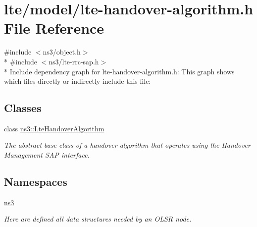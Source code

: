 \hypertarget{lte-handover-algorithm_8h}{}\section{lte/model/lte-\/handover-\/algorithm.h File Reference}
\label{lte-handover-algorithm_8h}
{\ttfamily \#include $<$ns3/object.\+h$>$}\\*
{\ttfamily \#include $<$ns3/lte-\/rrc-\/sap.\+h$>$}\\*
Include dependency graph for lte-\/handover-\/algorithm.h\+:
This graph shows which files directly or indirectly include this file\+:
\subsection*{Classes}
\begin{DoxyCompactItemize}
\item 
class \hyperlink{classns3_1_1LteHandoverAlgorithm}{ns3\+::\+Lte\+Handover\+Algorithm}
\begin{DoxyCompactList}\small\item\em The abstract base class of a handover algorithm that operates using the Handover Management S\+AP interface. \end{DoxyCompactList}\end{DoxyCompactItemize}
\subsection*{Namespaces}
\begin{DoxyCompactItemize}
\item 
 \hyperlink{namespacens3}{ns3}
\begin{DoxyCompactList}\small\item\em Here are defined all data structures needed by an O\+L\+SR node. \end{DoxyCompactList}\end{DoxyCompactItemize}
